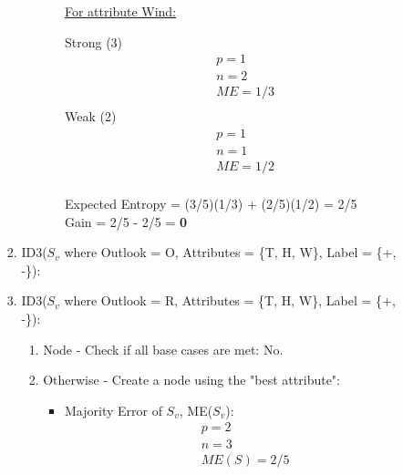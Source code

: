 \documentclass[8pt, fullpage,letterpaper]{article}
\begin{document}
\begin{enumerate}
\begin{enumerate}
\begin{enumerate}
\begin{enumerate}
\begin{itemize}
						\underline {For attribute Wind:} 
							\vspace{-5pt}
							\begin{multicols}{2}
								Strong (3)
			 						\begin{align*}
									    	& p = 1\\
										& n = 2 \\
									    	& ME = 1/3\\
								      \end{align*}
								Weak (2)
			 						\begin{align*}
									    	& p = 1\\
										& n = 1 \\
									    	& ME = 1/2\\
								      \end{align*}
							\end{multicols}
							\vspace{-20pt}
							Expected Entropy = (3/5)(1/3) + (2/5)(1/2) = 2/5\\
							Gain = 2/5 - 2/5 = {\bf 0}\\

					\centerline{}	
				\end{itemize}	
			\end{enumerate}


	 	\item ID3($S_v$ where Outlook = O, Attributes = \{T, H, W\}, Label = \{+, -\}): 
				\centerline{}	


	 	\item ID3($S_v$ where Outlook = R, Attributes = \{T, H, W\}, Label = \{+, -\}): 
			\begin{enumerate}
			\item Node - Check if all base cases are met: {\color{red} No}.
			\item Otherwise - Create a node using the "best attribute":
				\begin{itemize}
					\item Majority Error of $S_v$, ME($S_v$):
						\begin{align*}
						    	& p = 2\\
							& n = 3 \\
						    	& ME(S) = 2/5
					      \end{align*}


\end{itemize}
\end{enumerate}
\end{enumerate}
\end{enumerate}
\end{enumerate}
\end{document}
